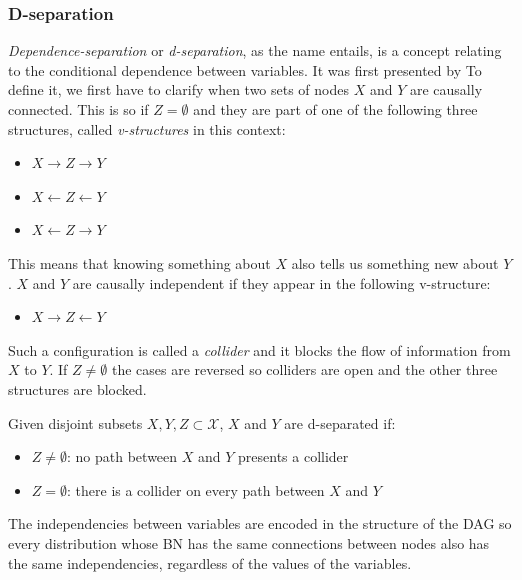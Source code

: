 \subsubsection{D-separation} \label{subsec:d-separation}
\textit{Dependence-separation} or \textit{d-separation}, as the name entails, is a concept relating to the conditional dependence between variables.
It was first presented by \cite{Pearl1988}
To define it, we first have to clarify when two sets of nodes $X$ and $Y$ are causally connected.
This is so if $Z = \emptyset$ and they are part of one of the following three structures, called \textit{v-structures} in this context:
\begin{itemize}
  \item $X \rightarrow Z \rightarrow Y$
  \item $X \leftarrow Z \leftarrow Y$
  \item $X \leftarrow Z \rightarrow Y$
\end{itemize}
This means that knowing something about $X$ also tells us something new about $Y$.
$X$ and $Y$ are causally independent if they appear in the following v-structure:
\begin{itemize}
  \item $X \rightarrow Z \leftarrow  Y$
\end{itemize}
Such a configuration is called a \textit{collider} and it blocks the flow of information from $X$ to $Y$.
If $Z \neq \emptyset$ the cases are reversed so colliders are open and the other three structures are blocked.
\begin{definition}
	Given disjoint subsets $X, Y, Z \subset \mathcal{X}$, $X$ and $Y$ are d-separated if:
	\begin{itemize}
		\item $Z \neq \emptyset$: no path between $X$ and $Y$ presents a collider
		\item $Z = \emptyset$: there is a collider on every path between $X$ and $Y$
	\end{itemize}
\end{definition}

The independencies between variables are encoded in the structure of the DAG so every distribution whose BN has the same connections between nodes also has the same independencies, regardless of the values of the variables.

